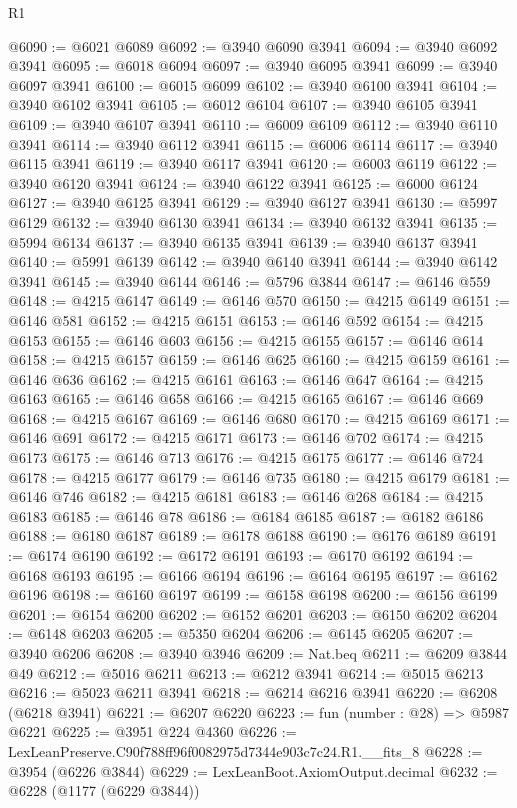 \begin{lexlean}{R1}
\begin{coremodule}
@6090 := @6021 @6089
@6092 := @3940 @6090 @3941
@6094 := @3940 @6092 @3941
@6095 := @6018 @6094
@6097 := @3940 @6095 @3941
@6099 := @3940 @6097 @3941
@6100 := @6015 @6099
@6102 := @3940 @6100 @3941
@6104 := @3940 @6102 @3941
@6105 := @6012 @6104
@6107 := @3940 @6105 @3941
@6109 := @3940 @6107 @3941
@6110 := @6009 @6109
@6112 := @3940 @6110 @3941
@6114 := @3940 @6112 @3941
@6115 := @6006 @6114
@6117 := @3940 @6115 @3941
@6119 := @3940 @6117 @3941
@6120 := @6003 @6119
@6122 := @3940 @6120 @3941
@6124 := @3940 @6122 @3941
@6125 := @6000 @6124
@6127 := @3940 @6125 @3941
@6129 := @3940 @6127 @3941
@6130 := @5997 @6129
@6132 := @3940 @6130 @3941
@6134 := @3940 @6132 @3941
@6135 := @5994 @6134
@6137 := @3940 @6135 @3941
@6139 := @3940 @6137 @3941
@6140 := @5991 @6139
@6142 := @3940 @6140 @3941
@6144 := @3940 @6142 @3941
@6145 := @3940 @6144
@6146 := @5796 @3844
@6147 := @6146 @559
@6148 := @4215 @6147
@6149 := @6146 @570
@6150 := @4215 @6149
@6151 := @6146 @581
@6152 := @4215 @6151
@6153 := @6146 @592
@6154 := @4215 @6153
@6155 := @6146 @603
@6156 := @4215 @6155
@6157 := @6146 @614
@6158 := @4215 @6157
@6159 := @6146 @625
@6160 := @4215 @6159
@6161 := @6146 @636
@6162 := @4215 @6161
@6163 := @6146 @647
@6164 := @4215 @6163
@6165 := @6146 @658
@6166 := @4215 @6165
@6167 := @6146 @669
@6168 := @4215 @6167
@6169 := @6146 @680
@6170 := @4215 @6169
@6171 := @6146 @691
@6172 := @4215 @6171
@6173 := @6146 @702
@6174 := @4215 @6173
@6175 := @6146 @713
@6176 := @4215 @6175
@6177 := @6146 @724
@6178 := @4215 @6177
@6179 := @6146 @735
@6180 := @4215 @6179
@6181 := @6146 @746
@6182 := @4215 @6181
@6183 := @6146 @268
@6184 := @4215 @6183
@6185 := @6146 @78
@6186 := @6184 @6185
@6187 := @6182 @6186
@6188 := @6180 @6187
@6189 := @6178 @6188
@6190 := @6176 @6189
@6191 := @6174 @6190
@6192 := @6172 @6191
@6193 := @6170 @6192
@6194 := @6168 @6193
@6195 := @6166 @6194
@6196 := @6164 @6195
@6197 := @6162 @6196
@6198 := @6160 @6197
@6199 := @6158 @6198
@6200 := @6156 @6199
@6201 := @6154 @6200
@6202 := @6152 @6201
@6203 := @6150 @6202
@6204 := @6148 @6203
@6205 := @5350 @6204
@6206 := @6145 @6205
@6207 := @3940 @6206
@6208 := @3940 @3946
@6209 := Nat.beq
@6211 := @6209 @3844 @49
@6212 := @5016 @6211
@6213 := @6212 @3941
@6214 := @5015 @6213
@6216 := @5023 @6211 @3941
@6218 := @6214 @6216 @3941
@6220 := @6208 (@6218 @3941)
@6221 := @6207 @6220
@6223 := fun (number : @28) => @5987 @6221
@6225 := @3951 @224 @4360
@6226 := LexLeanPreserve.C90f788ff96f0082975d7344e903c7c24.R1.__fits_8
@6228 := @3954 (@6226 @3844)
@6229 := LexLeanBoot.AxiomOutput.decimal
@6232 := @6228 (@1177 (@6229 @3844))

\end{coremodule}
\end{lexlean}
